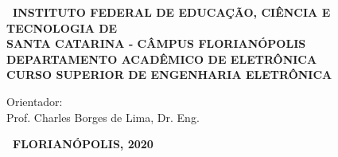\documentclass{ifscTCC} %
\begin{document}
\begin{capa}%
    \begin{SingleSpacing}
        \center
        \ABNTEXchapterfont\bfseries\ INSTITUTO FEDERAL DE EDUCAÇÃO, CIÊNCIA E TECNOLOGIA DE\\SANTA CATARINA - CÂMPUS FLORIANÓPOLIS\\DEPARTAMENTO ACADÊMICO DE ELETRÔNICA\\CURSO SUPERIOR DE ENGENHARIA ELETRÔNICA
        
        \vspace*{3.0cm}     %
        
        \ABNTEXchapterfont\bfseries\MakeUppercase\imprimirautor
        
        \vspace*{\fill} 
            \begin{center}
                \ABNTEXchapterfont\SingleSpacing\bfseries\Large\MakeUppercase\imprimirtitulo
            \end{center}
        \vspace*{\fill} 
        
        \hspace{.45\textwidth}
        \begin{minipage}{.5\textwidth}
            \begin{SingleSpacing}
                \normalfont\imprimirpreambulo
                \vspace*{1.0cm}
                
                Orientador:\\Prof. Charles Borges de Lima, Dr. Eng.
            \end{SingleSpacing}
        \end{minipage}%
        \vspace*{\fill} 
        
        \begin{center}
            \ABNTEXchapterfont\bfseries\ FLORIANÓPOLIS, 2020
        \end{center}
    \end{SingleSpacing}
\end{capa}
\end{document}
